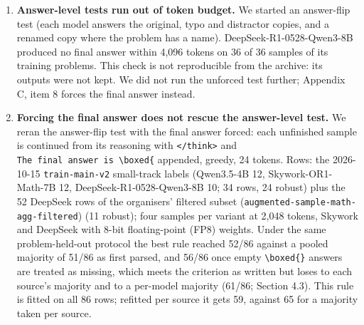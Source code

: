 \documentclass{article}
\begin{document}
\begin{enumerate}
  \textbf{The label is about perturbations of solved problems.} In the organisers' augmented set and its filtered subset,
  problems whose every base sample was correct are still mostly non-robust. The two sets are the
  same model, DeepSeek-R1-0528-Qwen3-8B (the organisers' starter repository, , maps the id
  \texttt{qwen3-8b:low} to it), and all 52 problems of \texttt{augmented-sample-math-agg-filtered} also appear in
  \texttt{augmented-sample-math-agg} (137 problems), so the two figures are not two models. Rows are per perturbation type, so a problem can appear in several rows: the filtered set has
  54 rows over 52 unique \texttt{problem\_id}, the larger set 141 rows over 137. Rows with \texttt{base\_accuracy}
  = 1.0 (any number of base samples, 1 to 60) are 52 of 54 and 138 of 141, nearly all rows, so the
  non-robust share among them (41 of 52, 79 \%; 102 of 138, 74 \%) matches the unconditional share
  (43 of 54, 80 \%; 105 of 141, 74 \%). Restricted to rows with exactly ten base samples: 34 of 40
  (85 \%) and 63 of 82 (77 \%). A script listed in \texttt{REPRODUCE.md} computes all of these. Answer consistency
  on the original cannot be tested in these sets. The public evaluation sets are near balance
  (always ``robust'' scores 0.48 on the main task, and the small-model set is 7 of 14 robust) while our 34
  labelled rows are 71 \% robust (Section 2), so a majority vote learned on the training rows is
  not a safe default.
\item
  \textbf{Answer-level tests run out of token budget.} We started an answer-flip test (each model
  answers the original, typo and distractor copies, and a renamed copy where the problem has a name). DeepSeek-R1-0528-Qwen3-8B
  produced no final answer within 4,096 tokens on 36 of 36 samples of its training problems. This
  check is not reproducible from the archive: its outputs were not kept. We did not run the
  unforced test further; Appendix C, item 8 forces the final answer instead.
\item
  \textbf{Forcing the final answer does not rescue the answer-level test.} We reran the answer-flip
  test with the final answer forced: each unfinished sample is continued from its reasoning with
  \texttt{\textless{}/think\textgreater{}} and \texttt{The\ final\ answer\ is\ \textbackslash{}boxed\{} appended, greedy, 24 tokens. Rows: the
  2026-10-15 \texttt{train-main-v2} small-track labels (Qwen3.5-4B 12, Skywork-OR1-Math-7B 12,
  DeepSeek-R1-0528-Qwen3-8B 10; 34 rows, 24 robust) plus the 52 DeepSeek rows of the organisers'
  filtered subset (\texttt{augmented-sample-math-agg-filtered}) (11 robust); four samples per variant at
  2,048 tokens, Skywork and DeepSeek with 8-bit floating-point (FP8) weights. Under the same problem-held-out protocol
  the best rule reached 52/86 against a pooled majority of 51/86 as first parsed, and 56/86 once empty \texttt{\textbackslash boxed\{\}} answers are treated as missing, which meets the criterion as written but loses to each source's majority and to a per-model majority (61/86; Section 4.3). This rule is fitted on all 86 rows; refitted per source it gets 59, against 65 for a majority taken per source.


\end{enumerate}
\end{document}
